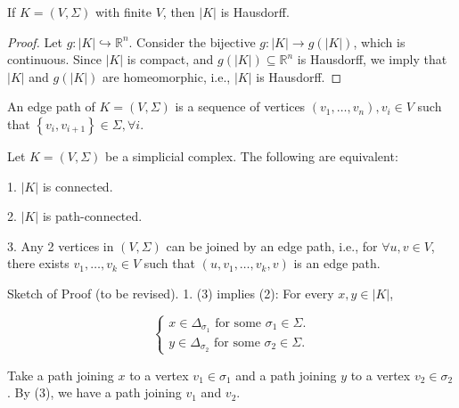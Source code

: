 \begin{proposition} If \(K = \left( {V,\Sigma }\right)\) with finite \(V\), then \(\left| K\right|\) is Hausdorff.
\end{proposition}

\begin{proof} Let \(g: \left| K\right| \hookrightarrow  {\mathbb{R}}^{n}\). Consider the bijective \(g: \left| K\right|  \rightarrow  g\left( \left| K\right| \right)\), which is continuous.
Since \(\left| K\right|\) is compact, and \(g\left( \left| K\right| \right)  \subseteq  {\mathbb{R}}^{n}\) is Hausdorff, we imply that \(\left| K\right|\) and \(g\left( \left| K\right| \right)\) are homeomorphic, i.e., \(\left| K\right|\) is Hausdorff.
\end{proof}

\begin{definition} \label{def:edge_path} An edge path of \(K = \left( {V,\Sigma }\right)\) is a sequence of vertices \(\left( {{v}_{1},\ldots,{v}_{n}}\right),{v}_{i} \in  V\) such that \(\left\{  {{v}_{i},{v}_{i + 1}}\right\}   \in  \Sigma,\forall i\).
\end{definition}

\begin{proposition} Let \(K = \left( {V,\Sigma }\right)\) be a simplicial complex. The following are equivalent:

1. \(\left| K\right|\) is connected.

2. \(\left| K\right|\) is path-connected.

3. Any 2 vertices in \(\left( {V,\Sigma }\right)\) can be joined by an edge path, i.e., for \(\forall u,v \in  V\), there exists \({v}_{1},\ldots,{v}_{k} \in  V\) such that \(\left( {u,{v}_{1},\ldots,{v}_{k},v}\right)\) is an edge path.
\end{proposition}

Sketch of Proof (to be revised). 1. (3) implies (2): For every \(x,y \in  \left| K\right|\),

\[
\left\{  \begin{array}{l} x \in  {\Delta }_{{\sigma }_{1}}\text{ for some }{\sigma }_{1} \in  \Sigma. \\  y \in  {\Delta }_{{\sigma }_{2}}\text{ for some }{\sigma }_{2} \in  \Sigma. \end{array}\right.
\]

Take a path joining \(x\) to a vertex \({v}_{1} \in  {\sigma }_{1}\) and a path joining \(y\) to a vertex \({v}_{2} \in  {\sigma }_{2}\). By (3), we have a path joining \({v}_{1}\) and \({v}_{2}\).

